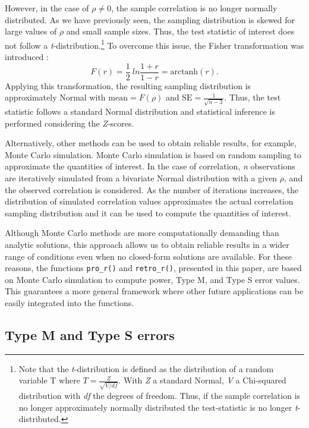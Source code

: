\documentclass{article}\usepackage[]{graphicx}\usepackage[]{color}
\begin{document}
\begin{refsection}
However, in the case of $\rho \neq 0$, the sample correlation is no longer normally distributed. As we have previously seen, the sampling distribution is skewed for large values of $\rho$ and small sample sizes. Thus, the test statistic of interest does not follow a \emph{t}-distribution.\footnote{Note that the \emph{t}-distribution is defined as the distribution of a random variable T where $T = \frac{Z}{\sqrt{V/df}}$. With \emph{Z} a standard Normal, \emph{V} a Chi-squared distribution with \emph{df} the degrees of freedom. Thus, if the sample correlation is no longer approximately normally distributed the test-statistic is no longer \emph{t}-distributed.} To overcome this issue, the Fisher transformation was introduced \parencite{fisherFrequencyDistributionValues1915}:
\begin{equation}
  F(r) = \frac{1}{2}\ ln \frac{1+r}{1-r} = \text{arctanh}(r).
\end{equation}
Applying this transformation, the resulting sampling distribution is approximately Normal with $\text{mean} = F(\rho)$ and $\text{SE} = \frac{1}{\sqrt{n-3}}$. Thus, the test statistic follows a standard Normal distribution and statistical inference is performed considering the \emph{Z}-scores.

Alternatively, other methods can be used to obtain reliable results, for example, Monte Carlo simulation. Monte Carlo simulation is based on random sampling to approximate the quantities of interest. In the case of correlation, \emph{n} observations are iteratively simulated from a bivariate Normal distribution with a given $\rho$, and the observed correlation is considered. As the number of iterations increases, the distribution of simulated correlation values approximates the actual correlation sampling distribution and it can be used to compute the quantities of interest.

Although Monte Carlo methods are more computationally demanding than analytic solutions, this approach allows us to obtain reliable results in a wider range of conditions even when no closed-form solutions are available. For these reasons, the functions \texttt{pro\_r()} and \texttt{retro\_r()}, presented in this paper, are based on Monte Carlo simulation to compute power, Type M, and Type S error values. This guarantees a more general framework where other future applications can be easily integrated into the functions.

\subsection{Type M and Type S errors}


\end{refsection}
\end{document}
